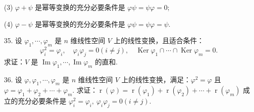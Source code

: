 \documentclass[UTF8, 12pt, fontset=fandol, oneside]{ctexart}
\begin{document}
(3) $\varphi+\psi$ 是幂等变换的充分必要条件是 $\varphi\psi=\psi\varphi=0$;

(4) $\varphi-\psi$ 是幂等变换的充分必要条件是 $\varphi\psi=\psi\varphi=\psi$.

35. 设 $\varphi_1,\cdots,\varphi_m$ 是 $n$ 维线性空间 $V$ 上的线性变换，且适合条件：
\[
\varphi_i^2=\varphi_i,\quad \varphi_i\varphi_j=0(i\neq j),\quad \operatorname{Ker}\varphi_1\cap\cdots\cap\operatorname{Ker}\varphi_m=0.
\]
求证：$V$ 是 $\operatorname{Im}\varphi_1,\cdots,\operatorname{Im}\varphi_m$ 的直和.

36. 设 $\varphi,\varphi_1,\cdots,\varphi_m$ 是 $n$ 维线性空间 $V$ 上的线性变换，满足：$\varphi^2=\varphi$ 且 $\varphi=\varphi_1+\varphi_2+\cdots+\varphi_m$. 求证：$\operatorname{r}(\varphi)=\operatorname{r}(\varphi_1)+\operatorname{r}(\varphi_2)+\cdots+\operatorname{r}(\varphi_m)$ 成立的充分必要条件是 $\varphi_i^2=\varphi_i,\ \varphi_i\varphi_j=0(i\neq j)$.
\end{document}
